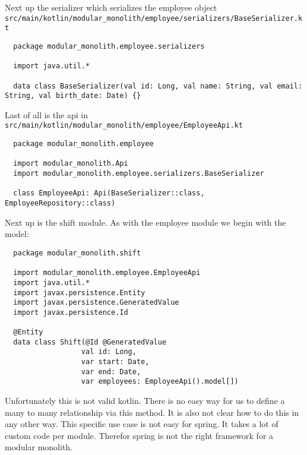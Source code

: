 Next up the serializer which serializes the employee object
\texttt{src/main/kotlin/modular\_monolith/employee/serializers/BaseSerializer.kt}
\begin{verbatim}
  package modular_monolith.employee.serializers

  import java.util.*

  data class BaseSerializer(val id: Long, val name: String, val email: String, val birth_date: Date) {}
\end{verbatim}

Last of all is the api in \texttt{src/main/kotlin/modular\_monolith/employee/EmployeeApi.kt}
\begin{verbatim}
  package modular_monolith.employee

  import modular_monolith.Api
  import modular_monolith.employee.serializers.BaseSerializer

  class EmployeeApi: Api(BaseSerializer::class, EmployeeRepository::class)
\end{verbatim}

Next up is the shift module. As with the employee module we begin with the model:
\begin{verbatim}
  package modular_monolith.shift

  import modular_monolith.employee.EmployeeApi
  import java.util.*
  import javax.persistence.Entity
  import javax.persistence.GeneratedValue
  import javax.persistence.Id

  @Entity
  data class Shift(@Id @GeneratedValue
                  val id: Long,
                  var start: Date,
                  var end: Date,
                  var employees: EmployeeApi().model[])
\end{verbatim}

Unfortunately this is not valid kotlin. There is no easy way for us to define a many to many relationship via this method. It is also not clear how to do this in any other way. This specific use case is not easy for spring. It takes a lot of custom code per module. Therefor spring is not the right framework for a modular monolith.
